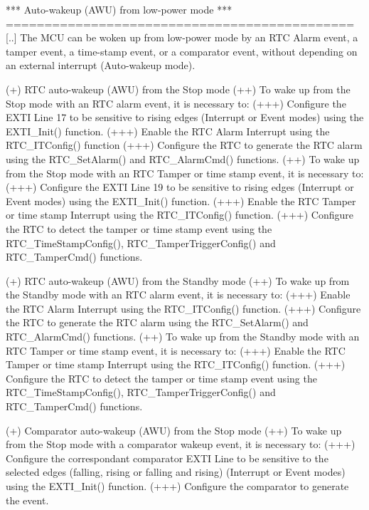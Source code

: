 \begin{DoxyVerb}
  *** Auto-wakeup (AWU) from low-power mode *** 
  =============================================
  [..] The MCU can be woken up from low-power mode by an RTC Alarm event, a tamper 
       event, a time-stamp event, or a comparator event, without depending on an 
       external interrupt (Auto-wakeup mode).

    (+) RTC auto-wakeup (AWU) from the Stop mode
        (++) To wake up from the Stop mode with an RTC alarm event, it is necessary to:
             (+++) Configure the EXTI Line 17 to be sensitive to rising edges (Interrupt 
                   or Event modes) using the EXTI_Init() function.
             (+++) Enable the RTC Alarm Interrupt using the RTC_ITConfig() function
             (+++) Configure the RTC to generate the RTC alarm using the RTC_SetAlarm() 
                   and RTC_AlarmCmd() functions.
        (++) To wake up from the Stop mode with an RTC Tamper or time stamp event, it 
             is necessary to:
             (+++) Configure the EXTI Line 19 to be sensitive to rising edges (Interrupt 
                   or Event modes) using the EXTI_Init() function.
             (+++) Enable the RTC Tamper or time stamp Interrupt using the RTC_ITConfig() 
                   function.
             (+++) Configure the RTC to detect the tamper or time stamp event using the
                   RTC_TimeStampConfig(), RTC_TamperTriggerConfig() and RTC_TamperCmd()
                   functions.

    (+) RTC auto-wakeup (AWU) from the Standby mode
        (++) To wake up from the Standby mode with an RTC alarm event, it is necessary to:
             (+++) Enable the RTC Alarm Interrupt using the RTC_ITConfig() function.
             (+++) Configure the RTC to generate the RTC alarm using the RTC_SetAlarm() 
                   and RTC_AlarmCmd() functions.
        (++) To wake up from the Standby mode with an RTC Tamper or time stamp event, it 
             is necessary to:
             (+++) Enable the RTC Tamper or time stamp Interrupt using the RTC_ITConfig() 
                   function.
             (+++) Configure the RTC to detect the tamper or time stamp event using the
                   RTC_TimeStampConfig(), RTC_TamperTriggerConfig() and RTC_TamperCmd()
                   functions.

    (+) Comparator auto-wakeup (AWU) from the Stop mode
        (++) To wake up from the Stop mode with a comparator wakeup event, it is necessary to:
             (+++) Configure the correspondant comparator EXTI Line to be sensitive to 
                   the selected edges (falling, rising or falling and rising) 
                   (Interrupt or Event modes) using the EXTI_Init() function.
             (+++) Configure the comparator to generate the event.\end{DoxyVerb}


